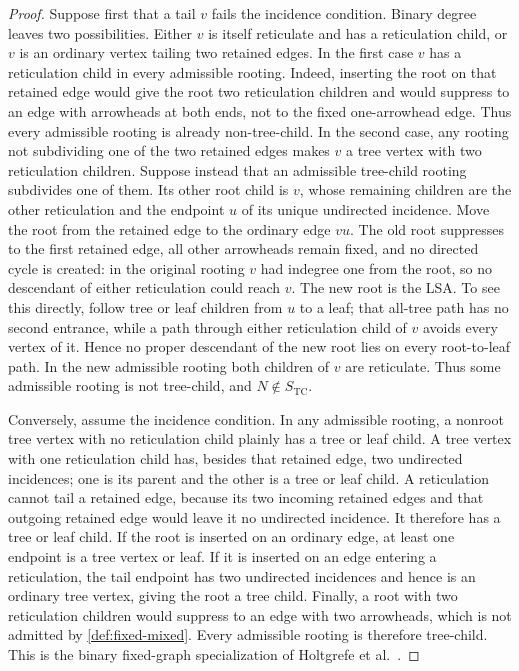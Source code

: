 \documentclass[11pt]{article}
\theoremstyle{remark}
\newcommand{\TCs}{S_{\mathrm{TC}}}
\begin{document}
\begin{proof}
Suppose first that a tail $v$ fails the incidence condition.  Binary degree
leaves two possibilities.  Either $v$ is itself reticulate and has a
reticulation child, or $v$ is an ordinary vertex tailing two retained edges.
In the first case $v$ has a reticulation child in every admissible rooting.
Indeed, inserting the root on that retained edge would give the root two
reticulation children and would suppress to an edge with arrowheads at both
ends, not to the fixed one-arrowhead edge.  Thus every admissible rooting is
already non-tree-child.  In the second case, any rooting not subdividing one
of the two retained edges makes $v$ a tree vertex with two reticulation
children.  Suppose instead that an admissible tree-child rooting subdivides
one of them.  Its other root child is $v$, whose remaining children are the
other reticulation and the endpoint $u$ of its unique undirected incidence.
Move the root from the retained edge to the ordinary edge $vu$.  The old
root suppresses to the first retained edge, all other arrowheads remain
fixed, and no directed cycle is created: in the original rooting $v$ had
indegree one from the root, so no descendant of either reticulation could
reach $v$.  The new root is the LSA.  To see this directly, follow tree or
leaf children from $u$ to a leaf; that all-tree path has no second entrance,
while a path through either reticulation child of $v$ avoids every vertex of
it.  Hence no proper descendant of the new root lies on every root-to-leaf
path.  In the new admissible rooting both children of $v$ are reticulate.
Thus some admissible rooting is not tree-child, and $N\notin\TCs$.

Conversely, assume the incidence condition.  In any admissible rooting, a
nonroot tree vertex with no reticulation child plainly has a tree or leaf
child.  A tree vertex with one reticulation child has, besides that retained
edge, two undirected incidences; one is its parent and the other is a tree or
leaf child.  A reticulation cannot tail a retained edge, because its two
incoming retained edges and that outgoing retained edge would leave it no
undirected incidence.  It therefore has a tree or leaf child.  If the root is
inserted on an ordinary edge, at least one endpoint is a tree vertex or leaf.
If it is inserted on an edge entering a reticulation, the tail endpoint has
two undirected incidences and hence is an ordinary tree vertex, giving the
root a tree child.  Finally, a root with two reticulation children would
suppress to an edge with two arrowheads, which is not admitted by
\cref{def:fixed-mixed}.  Every admissible rooting is therefore tree-child.
This is the binary fixed-graph specialization of
Holtgrefe et al.~\cite[Theorem~5]{HoltgrefeEtAl2026}.
\end{proof}
\end{document}
